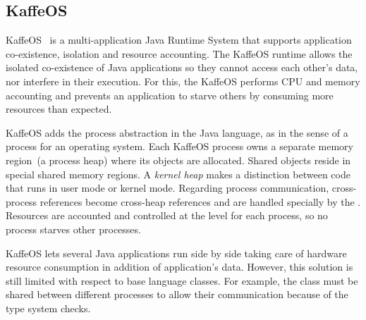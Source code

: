 \subsection*{KaffeOS}

KaffeOS~\cite{Back00a} is a multi-application Java Runtime System that supports application co-existence, isolation and resource accounting. The KaffeOS runtime allows the isolated co-existence of Java applications so they cannot access each other's data, nor interfere in their execution. For this, the KaffeOS \VM performs CPU and memory accounting and prevents an application to starve others by consuming more resources than expected.

KaffeOS adds the process abstraction in the Java language, as in the sense of a process for an operating system. Each KaffeOS process owns a separate memory region~(a process heap) where its objects are allocated. Shared objects reside in special shared memory regions. A \emph{kernel heap} makes a distinction between code that runs in user mode or kernel mode. Regarding process communication, cross-process references become cross-heap references and are handled specially by the \VM. Resources are accounted and controlled at the \VM level for each process, so no process starves other processes.

KaffeOS lets several Java applications run side by side taking care of hardware resource consumption in addition of application's data. However, this solution is still limited with respect to base language classes. For example, the class  must be shared between different processes to allow their communication because of the type system checks.

%


